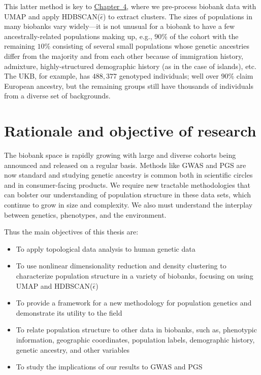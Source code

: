 This latter method is key to \hyperref[chap:chapter4]{Chapter~4}, where we pre-process biobank data with UMAP and apply HDBSCAN($\hat{\epsilon}$) to extract clusters. The sizes of populations in many biobanks vary widely---it is not unusual for a biobank to have a few ancestrally-related populations making up, e.g., $90\%$ of the cohort with the remaining $10\%$ consisting of several small populations whose genetic ancestries differ from the majority and from each other because of immigration history, admixture, highly-structured demographic history (as in the case of islands), etc. The UKB, for example, has $488,377$ genotyped individuals; well over $90\%$ claim European ancestry, but the remaining groups still have thousands of individuals from a diverse set of backgrounds.

\section{Rationale and objective of research}

The biobank space is rapidly growing with large and diverse cohorts being announced and released on a regular basis. Methods like GWAS and PGS are now standard and studying genetic ancestry is common both in scientific circles and in consumer-facing products. We require new tractable methodologies that can bolster our understanding of population structure in these data sets, which continue to grow in size and complexity. We also must understand the interplay between genetics, phenotypes, and the environment. 

Thus the main objectives of this thesis are:
\begin{itemize}
\item To apply topological data analysis to human genetic data
\item To use nonlinear dimensionality reduction and density clustering to characterize population structure in a variety of biobanks, focusing on using UMAP and HDBSCAN($\hat{\epsilon}$)
\item To provide a framework for a new methodology for population genetics and demonstrate its utility to the field
\item To relate population structure to other data in biobanks, such as, phenotypic information, geographic coordinates, population labels, demographic history, genetic ancestry, and other variables
\item To study the implications of our results to GWAS and PGS
\end{itemize}

\clearpage